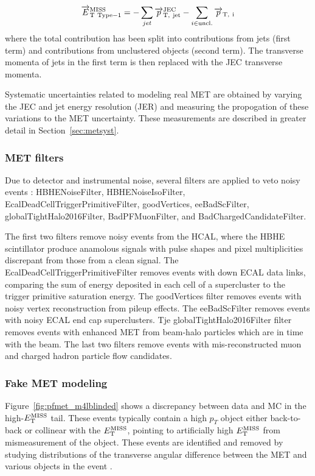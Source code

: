 \begin{equation}
\label{eq:t1met}
\overrightarrow{E}_{\rm{T\ Type-1}}^{\rm{MISS}} = - \sum_{jet} \overrightarrow{p}_{\rm{T},\ jet}^{\rm{JEC}} - \sum_{i \in \rm{uncl.}} \overrightarrow{p}_{\rm{T},\ i}
\end{equation}
where the total contribution has been split into contributions from jets (first term) and contributions from unclustered objects (second term). The transverse momenta of jets in the first term is then replaced with the JEC transverse momenta.

Systematic uncertainties related to modeling real MET are obtained by varying the JEC and jet energy resolution (JER) and measuring the propogation of these variations to the MET uncertainty. These measurements are described in greater detail in Section~\ref{sec:metsyst}.

\subsubsection{MET filters}

Due to detector and instrumental noise, several filters are applied to veto noisy events \cite{mettwiki}:
HBHENoiseFilter,
HBHENoiseIsoFilter,
EcalDeadCellTriggerPrimitiveFilter, 
goodVertices, 
eeBadScFilter, 
globalTightHalo2016Filter, 
BadPFMuonFilter, and
BadChargedCandidateFilter.

The first two filters remove noisy events from the HCAL, where the HBHE scintillator produce anamolous signals with pulse shapes and pixel multiplicities discrepant from those from a clean signal. The EcalDeadCellTriggerPrimitiveFilter removes events with down ECAL data links, comparing the sum of energy deposited in each cell of a supercluster to the trigger primitive saturation energy. The goodVertices filter removes events with noisy vertex reconstruction from pileup effects. The eeBadScFilter removes events with noisy ECAL end cap superclusters. Tje globalTightHalo2016Filter filter removes events with enhanced MET from beam-halo particles which are in time with the beam. The last two filters remove events with mis-reconstructed muon and charged hadron particle flow candidates.

\subsubsection{Fake MET modeling}\label{sec:fakemet}

Figure~\ref{fig:pfmet_m4lblinded} shows a discrepancy between data and MC in the high-$E_{\rm{T}}^{\rm{MISS}}$ tail. These events typically contain a high $p_T$ object either back-to-back or collinear with the $E_{\rm{T}}^{\rm{MISS}}$, pointing to artificially high $E_{\rm{T}}^{\rm{MISS}}$ from mismeasurement of the object. These events are identified and removed by studying distributions of the transverse angular difference between the MET and various objects in the event \cite{CMS-AN-15-203}.

